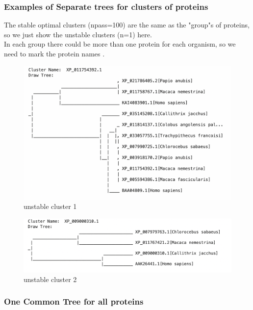 \documentclass[a4paper, 12pt, one column]{article}
\begin{document}
\subsubsection{Examples of Separate trees for clusters of proteins}
The stable optimal clusters (npass=100) are the same as the "group"s of proteins, so we just show the unstable clusters (n=1) here. \\
In each group there could be more than one protein for each organism, so we need to mark the protein names .\\
\begin{figure}[H]
    \centering
    \includegraphics[width=.8\linewidth]{cluster_1.png}
    \caption{unstable cluster 1}
    \label{fig:cluster_1.png}
\end{figure}
\begin{figure}[H]
    \centering
    \includegraphics[width=.8\linewidth]{cluster_2.png}
    \caption{unstable cluster 2}
    \label{fig:cluster_2.png}
\end{figure}  


\subsubsection{One Common Tree for all proteins}
\end{document}
